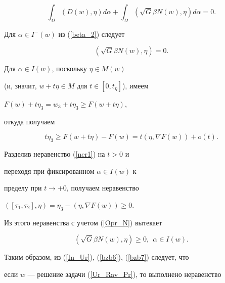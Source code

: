 \begin{equation}


\int_\Omega ( {D (w), \eta} ) d \alpha 


+\int_\Omega ( \sqrt G \beta N(w), \eta ) d \alpha=0.


\label{In_Ur}


\end{equation}


Для $\alpha \in I^{-}(w) $ из (\ref{beta_2}) следует


\begin{equation}


(\sqrt G \beta N(w), \eta )=0.


\label{bzb6}


\end{equation}


Для $\alpha \in I(w)$, поскольку $\eta \in M(w)$


(и, значит, $w+t \eta \in M$ для $t \in [0,t_\eta ]$), имеем 


$F(w)+t \eta_3=w_3+t \eta_3 \geq F(w+t \eta)$,


откуда получаем


\begin{equation}


t \eta_3 \geq F(w+t \eta)-F(w)=t (\eta, \nabla F(w) )+o(t).


\label{ner1}


\end{equation}


Разделив неравенство (\ref{ner1}) на $t>0$ и


переходя при фиксированном $\alpha \in I(w) $ к 


пределу при $t \to+0$, получаем неравенство 


$( {[\tau_1,\tau_2], \eta} )=\eta_3 -(\eta, \nabla F(w) ) \geq 0$.


Из этого неравенства с учетом (\ref{Opr_N}) вытекает


\begin{equation}


( \sqrt G \beta N(w), \eta ) \geq 0,\ \ \alpha \in I(w).


\label{bzb7}


\end{equation} 





Таким образом, из (\ref{In_Ur}), (\ref{bzb6}), (\ref{bzb7}) следует, что 


если $w$ --- решение задачи (\ref{Ur_Rav_Pr}), то выполнено неравенство


